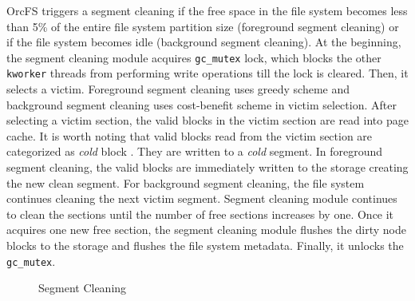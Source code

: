 \documentclass[prodmode,acmtecs]{acmsmall}
\begin{document}
OrcFS triggers a segment cleaning if the free space in the file system
becomes less than 5\% of the entire file system partition size
(foreground segment cleaning) or if the file system becomes 
idle (background segment cleaning). At the beginning, the segment cleaning
module acquires \texttt{gc\_mutex} lock, which blocks the other
\texttt{kworker} threads from performing write operations till the
lock is cleared. Then, it selects a victim. Foreground
segment cleaning uses greedy \cite{kawaguchi1995Flash} scheme and
background segment cleaning uses cost-benefit
\cite{rosenblum1992design} scheme in victim selection. After selecting
a victim section, the valid blocks in the victim section are read into
page cache. It is worth noting that valid blocks read from the victim
section are categorized as \emph{cold} block \cite{lee2015f2fs}. They
are written to a \emph{cold} segment. In foreground segment cleaning,
the valid blocks are immediately written to the storage creating the
new clean segment. For background segment cleaning, the file system
continues cleaning the next victim segment.  Segment cleaning module
continues to clean the sections until the number of free sections
increases by one. Once it acquires one new free section, the segment
cleaning module flushes the dirty node blocks to the storage and
flushes the file system metadata. Finally, it unlocks the
\texttt{gc\_mutex}.


\begin{figure}[t]
\centering
 \hspace{-1.3em}
 \caption{Segment Cleaning}
 \label{fig:quasi_sc}
\end{figure}
\end{document}
